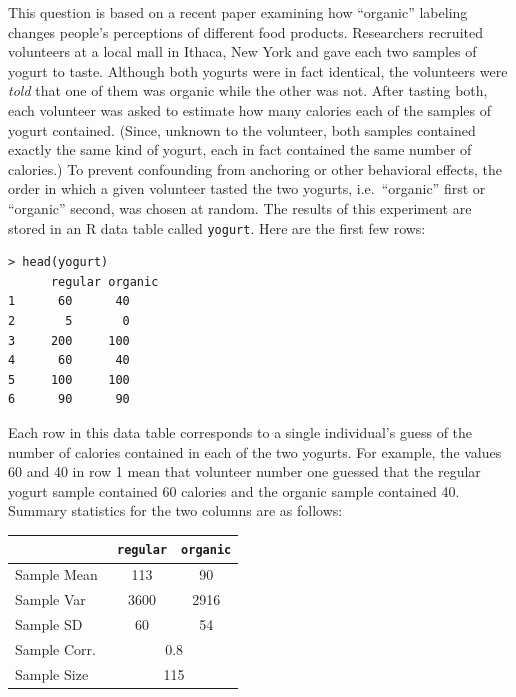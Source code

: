 \documentclass[addpoints,12pt]{exam}
\begin{document}
\begin{questions}


  \newpage

\question This question is based on a recent paper examining how ``organic'' labeling changes people's perceptions of different food products. Researchers recruited volunteers at a local mall in Ithaca, New York and gave each two samples of yogurt to taste. Although both yogurts were in fact identical, the volunteers were \emph{told} that one of them was organic while the other was not. After tasting both, each volunteer was asked to estimate how many calories each of the samples of yogurt contained. (Since, unknown to the volunteer, both samples contained exactly the same kind of yogurt, each in fact contained the same number of calories.) To prevent confounding from anchoring or other behavioral effects, the order in which a given volunteer tasted the two yogurts, i.e.\ ``organic'' first or ``organic'' second, was chosen at random. The results of this experiment are stored in an R data table called \texttt{yogurt}. Here are the first few rows:
	\begin{verbatim}
> head(yogurt)
	  regular organic
1      60      40
2       5       0
3     200     100
4      60      40
5     100     100
6      90      90
	\end{verbatim}
Each row in this data table corresponds to a single individual's guess of the number of calories contained in each of the two yogurts. For example, the values 60 and 40 in row 1 mean that volunteer number one guessed that the regular yogurt sample contained 60 calories and the organic sample contained 40. Summary statistics for the two columns are as follows:
	\begin{center}
		\begin{tabular}{|lcc|}
		\hline
			& \texttt{regular} & \texttt{organic}\\
			\hline
		Sample Mean & 113 & 90\\
		Sample Var & 3600 & 2916\\
		Sample SD & 60 & 54\\ 
		Sample Corr.\ &\multicolumn{2}{c|}{0.8} \\
		Sample Size &\multicolumn{2}{c|}{115} \\
		\hline
		\end{tabular}
	\end{center}
	\vspace{1em}
	\begin{parts}

\end{parts}
\end{questions}
\end{document}
